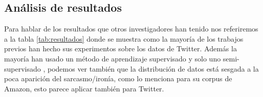 % 		
		
		\subsection{Análisis de resultados}
		
		\par Para hablar de los resultados que otros investigadores han tenido nos referiremos a la tabla \ref{tab:resultados} donde se muestra como la mayoría de los trabajos previos han hecho sus experimentos sobre los datos de Twitter. Además la mayoría han usado un método de aprendizaje supervisado y solo uno semi-supervisado \cite{davidov2010semi}, podemos ver también que la distribución de datos está sesgada a la poca aparición del sarcasmo/ironía, como lo menciona \cite{liu2007low} para su corpus de Amazon, esto parece aplicar también para Twitter.
	
